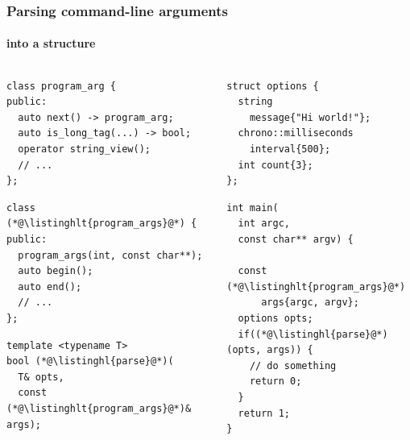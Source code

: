 \documentclass[compress,table,xcolor=table]{beamer}
\begin{document}
\begin{frame}[fragile]
  \frametitle{Parsing command-line arguments}
  \framesubtitle{into a structure}
  \begin{columns}
    \begin{column}{.57\textwidth}
      \begin{lstlisting}[language=c++2x,basicstyle=\scriptsize\ttfamily]
class program_arg {
public:
  auto next() -> program_arg;
  auto is_long_tag(...) -> bool;
  operator string_view();
  // ...
};
      \end{lstlisting}
      \vfill
      \begin{lstlisting}[language=c++2x,basicstyle=\scriptsize\ttfamily]
class (*@\listinghlt{program_args}@*) {
public:
  program_args(int, const char**);
  auto begin();
  auto end();
  // ...
};
      \end{lstlisting}
      \vfill
      \begin{lstlisting}[language=c++2x,basicstyle=\scriptsize\ttfamily]
template <typename T>
bool (*@\listinghl{parse}@*)(
  T& opts,
  const (*@\listinghlt{program_args}@*)& args);
      \end{lstlisting}
    \end{column}
    \begin{column}{.44\textwidth}
      \begin{lstlisting}[language=c++2x,basicstyle=\scriptsize\ttfamily]
struct options {
  string
    message{"Hi world!"};
  chrono::milliseconds
    interval{500};
  int count{3};
};
      \end{lstlisting}
      \vfill
      \begin{lstlisting}[language=c++2x,basicstyle=\scriptsize\ttfamily]
int main(
  int argc,
  const char** argv) {

  const (*@\listinghlt{program_args}@*)
      args{argc, argv};
  options opts;
  if((*@\listinghl{parse}@*)(opts, args)) {
    // do something
    return 0;
  }
  return 1;
}
      \end{lstlisting}
    \end{column}
  \end{columns}
\end{frame}
\end{document}
